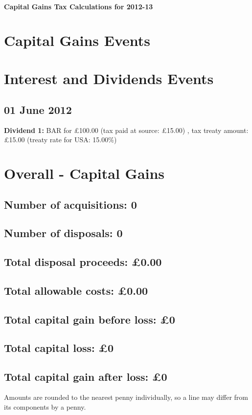 \documentclass{article}
\begin{document}
\centerline{\Large\bfseries Capital Gains Tax Calculations for 2012-13}

\section*{Capital Gains Events}


\clearpage
\section*{Interest and Dividends Events}


\subsection*{01 June 2012}
\textbf{Dividend 1:} BAR for £100.00
(tax paid at source: £15.00)
, tax treaty amount: £15.00 (treaty rate for USA: 15.00\%)



\clearpage
\section*{Overall - Capital Gains}
\subsection*{Number of acquisitions: 0}
\subsection*{Number of disposals: 0}
\subsection*{Total disposal proceeds: £0.00}
\subsection*{Total allowable costs: £0.00}
\subsection*{Total capital gain before loss: £0}
\subsection*{Total capital loss: £0}
\subsection*{Total capital gain after loss: £0}
\vspace{1em}
Amounts are rounded to the nearest penny individually, so a line may differ from its components by a penny.
\vspace{2em}
\end{document}
